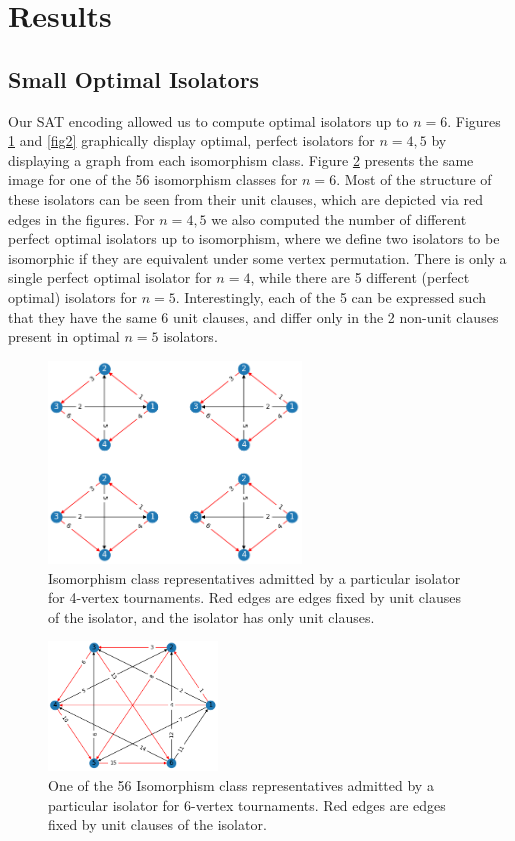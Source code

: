 \documentclass[a4paper,UKenglish,cleveref, autoref, thm-restate]{lipics-v2021}
\begin{document}
\section{Results}

\subsection{Small Optimal Isolators}

Our SAT encoding allowed us to compute optimal isolators up to $n=6$. Figures \ref{fig1} and \ref{fig2} graphically display optimal, perfect isolators for $n=4,5$ by displaying a graph from each isomorphism class. Figure \ref{fig3} presents the same image for one of the 56 isomorphism classes for $n=6$. Most of the structure of these isolators can be seen from their unit clauses, which are depicted via red edges in the figures. For $n=4,5$ we also computed the number of different perfect optimal isolators up to isomorphism, where we define two isolators to be isomorphic if they are equivalent under some vertex permutation. There is only a single perfect optimal isolator for $n=4$, while there are 5 different (perfect optimal) isolators for $n=5$. Interestingly, each of the 5 can be expressed such that they have the same 6 unit clauses, and differ only in the 2 non-unit clauses present in optimal $n=5$ isolators.

\begin{figure}
\includegraphics[width=0.6\textwidth]{iso_4.png}
\caption{Isomorphism class representatives admitted by a particular isolator for 4-vertex tournaments. Red edges are edges fixed by unit clauses of the isolator, and the isolator has only unit clauses.} \label{fig1}
\end{figure}

\begin{figure}
\includegraphics[width=0.4\textwidth]{iso6.png}
\caption{One of the 56 Isomorphism class representatives admitted by a particular isolator for 6-vertex tournaments. Red edges are edges fixed by unit clauses of the isolator.} \label{fig3}
\end{figure}
\end{document}
